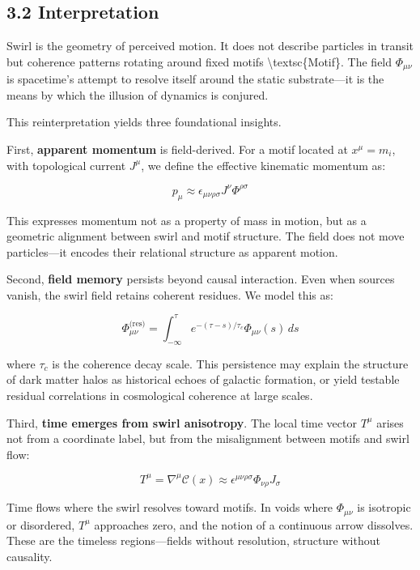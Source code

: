 \documentclass[
  11pt,
]{article}
\begin{document}
\subsection{3.2 Interpretation}\label{interpretation}

Swirl is the geometry of perceived motion. It does not describe
particles in transit but coherence patterns rotating around fixed motifs
\textbackslash textsc\{Motif\}. The field \(\Phi_{\mu\nu}\) is
spacetime's attempt to resolve itself around the static substrate---it
is the means by which the illusion of dynamics is conjured.

This reinterpretation yields three foundational insights.

First, \textbf{apparent momentum} is field-derived. For a motif located
at \(x^\mu = m_i\), with topological current \(J^\mu\), we define the
effective kinematic momentum as:

\[
p_\mu \approx \epsilon_{\mu\nu\rho\sigma} J^\nu \Phi^{\rho\sigma}
\]

This expresses momentum not as a property of mass in motion, but as a
geometric alignment between swirl and motif structure. The field does
not move particles---it encodes their relational structure as apparent
motion.

Second, \textbf{field memory} persists beyond causal interaction. Even
when sources vanish, the swirl field retains coherent residues. We model
this as:

\[
\Phi_{\mu\nu}^{\text{(res)}} = \int_{-\infty}^{\tau} e^{-(\tau - s)/\tau_c} \Phi_{\mu\nu}(s) \, ds
\]

where \(\tau_c\) is the coherence decay scale. This persistence may
explain the structure of dark matter halos as historical echoes of
galactic formation, or yield testable residual correlations in
cosmological coherence at large scales.

Third, \textbf{time emerges from swirl anisotropy}. The local time
vector \(T^\mu\) arises not from a coordinate label, but from the
misalignment between motifs and swirl flow:

\[
T^\mu = \nabla^\mu \mathcal{C}(x) \approx \epsilon^{\mu\nu\rho\sigma} \Phi_{\nu\rho} J_\sigma
\]

Time flows where the swirl resolves toward motifs. In voids where
\(\Phi_{\mu\nu}\) is isotropic or disordered, \(T^\mu\) approaches zero,
and the notion of a continuous arrow dissolves. These are the timeless
regions---fields without resolution, structure without causality.
\end{document}
